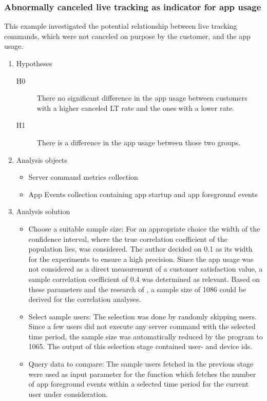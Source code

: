 \subsubsection{Abnormally canceled live tracking as indicator for app usage}
\label{sssec:liveTrackingAppUsage}
This example investigated the potential relationship between live tracking commands, which were not canceled on purpose by the customer, and the app usage.  

\begin{enumerate}
	\item Hypotheses
	\begin{description}
		\item[H0] There no significant difference in the app usage between customers with a higher canceled LT rate and the ones with a lower rate.
		\item [H1] There is a difference in the app usage between those two groups. 
	\end{description}
	\item Analysis objects
	\begin{itemize}
		\item Server command metrics collection
		\item App Events collection containing app startup and app foreground events
	\end{itemize}
	\item Analysis solution
	\begin{itemize}
		\item Choose a suitable sample size: For an appropriate choice the width of the confidence interval, where the true correlation coefficient of the population lies, was considered. The author decided on 0.1 as its width for the experiments to ensure a high precision. Since the app usage was not considered as a direct measurement of a customer satisfaction value, a sample correlation coefficient of 0.4 was determined as relevant. Based on these parameters and the research of \cite{moinester2014sample}, a sample size of 1086 could be derived for the correlation analyses. 
		\item Select sample users: The selection was done by randomly skipping users. Since a few users did not execute any server command with the selected time period, the sample size was automatically reduced by the program to 1065. The output of this selection stage contained user- and device ids.
		\item Query data to compare: The sample users fetched in the previous stage were used as input parameter for the function which fetches the number of app foreground events within a selected time period for the current user under consideration. 

\end{itemize}
\end{enumerate}
